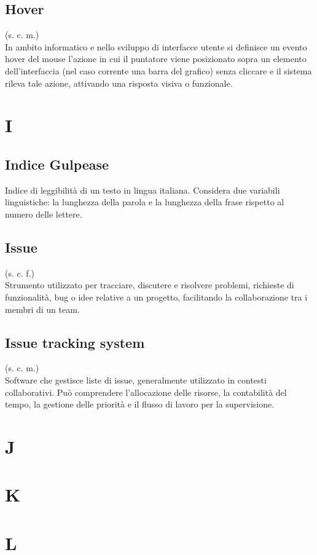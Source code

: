     \subsection{Hover}
    (s. c. m.)\\
    In ambito informatico e nello sviluppo di interfacce utente si definisce un evento hover del mouse
    l'azione in cui il puntatore viene posizionato sopra un elemento dell'interfaccia 
    (nel caso corrente una barra del grafico) senza cliccare e il sistema rileva tale azione, attivando una risposta visiva o funzionale.
\pagebreak
\section{I}
    \subsection{Indice Gulpease}
    Indice di leggibilità di un testo in lingua italiana. Considera due variabili 
    linguistiche: la lunghezza della parola e la lunghezza della frase rispetto 
    al numero delle lettere.
    \subsection{Issue}
    \label{Issue}
    (s. c. f.)\\
    Strumento utilizzato per tracciare, discutere e risolvere problemi, richieste di funzionalità, 
    bug o idee relative a un progetto, facilitando la collaborazione tra i membri di un team.
    \subsection{Issue tracking system}
    (s. c. m.)\\
    Software che gestisce liste di issue, generalmente utilizzato in contesti collaborativi.
    Può comprendere l'allocazione delle risorse, la contabilità del tempo, la gestione delle 
    priorità e il flusso di lavoro per la supervisione.
\pagebreak
\section{J}
\pagebreak
\section{K}
\pagebreak
\section{L}
